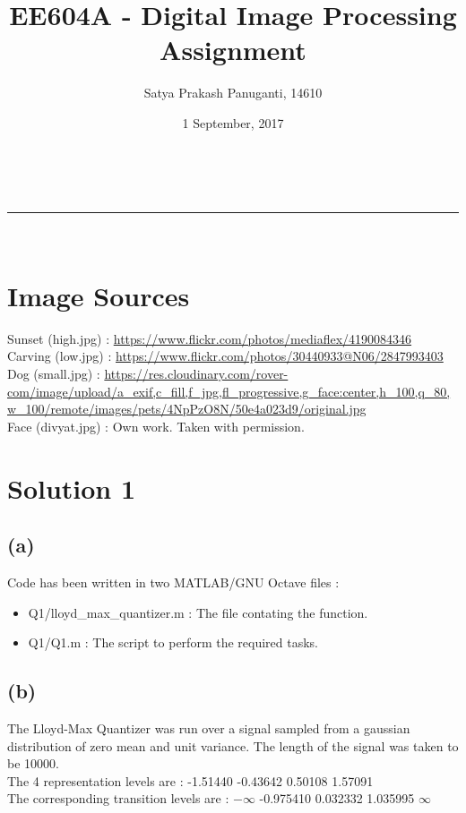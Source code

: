 \documentclass[a4paper,fleqn,11pt]{article}
\makeatletter
\newcommand{\linia}{\rule{\linewidth}{0.5pt}}
\theoremstyle{mytheor}
\renewcommand{\maketitle}{
\begin{center}
\vspace{2ex}
{\huge \textsc{\@title}}
\vspace{1ex}
\\
\linia\\
\@author \hfill \@date
\vspace{4ex}
\end{center}
}
\makeatother
\begin{document}
\title{EE604A - Digital Image Processing Assignment}

\author{Satya Prakash Panuganti, 14610}

\date{1 September, 2017}

\maketitle

\section*{Image Sources}
Sunset  (high.jpg)  : \url{https://www.flickr.com/photos/mediaflex/4190084346} \\
Carving (low.jpg)   : \url{https://www.flickr.com/photos/30440933@N06/2847993403} \\
Dog     (small.jpg) : \url{https://res.cloudinary.com/rover-com/image/upload/a_exif,c_fill,f_jpg,fl_progressive,g_face:center,h_100,q_80,w_100/remote/images/pets/4NpPzO8N/50e4a023d9/original.jpg} \\
Face (divyat.jpg)   : Own work. Taken with permission.
\section*{Solution 1}
\subsection*{(a)}
Code has been written in two MATLAB\textregistered/GNU Octave files :
\begin{itemize}
\item Q1/lloyd\_max\_quantizer.m : The file contating the function.
\item Q1/Q1.m : The script to perform the required tasks.
\end{itemize}
\subsection*{(b)}
The Lloyd-Max Quantizer was run over a signal sampled from a gaussian distribution of zero mean and unit variance. The length of the signal was taken to be 10000. \\
The 4 representation levels are : -1.51440  -0.43642  0.50108  1.57091 \\
The corresponding transition levels are : $-\infty$  -0.975410  0.032332  1.035995  $\infty$
\end{document}
